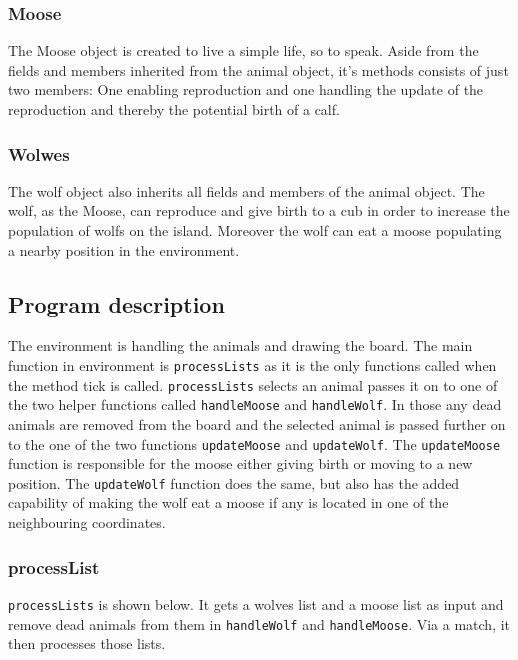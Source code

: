 \documentclass[a4paper]{report}
\begin{document}
\subsubsection*{Moose}
The Moose object is created to live a simple life, so to speak. Aside from the fields and members inherited from the animal object, it's methods consists of just two members: One enabling reproduction and one handling the update of the reproduction and thereby the potential birth of a calf.

\subsubsection*{Wolwes}
The wolf object also inherits all fields and members of the animal object. The wolf, as the Moose, can reproduce and give birth to a cub in order to increase the population of wolfs on the island. Moreover the wolf can eat a moose populating a nearby position in the environment. 

\subsection*{Program description}

The environment is handling the animals and drawing the board. The main function in environment is \texttt{processLists}  as it is the only functions called when the method tick is called.
\texttt{processLists} selects an animal passes it on to one of the two helper functions called \texttt{handleMoose}  and \texttt{handleWolf}. In those any dead animals are removed from the board and the selected animal is passed further on to the one of the two functions \texttt{updateMoose} and \texttt{updateWolf}. The \texttt{updateMoose} function is responsible for the moose either giving birth or moving to a new position.
The \texttt{updateWolf} function does the same, but also has the added capability of making the wolf eat a moose if any is located in one of the neighbouring coordinates.

\subsubsection*{processList}
\texttt{processLists} is shown below. It gets a wolves list and a moose list as input and remove dead animals from them in \texttt{handleWolf} and \texttt{handleMoose}. Via a match, it then processes those lists.


\end{document}
